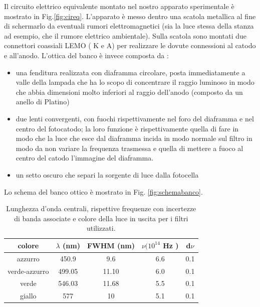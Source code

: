 \documentclass[10pt,a4paper]{article}
\begin{document}
Il circuito elettrico equivalente montato nel nostro apparato sperimentale è mostrato in Fig.\ref{fig:cireq}. L'apparato è messo dentro una scatola metallica al fine di schermarlo da eventuali rumori elettromagnetici (sia la luce stessa della stanza ad esempio, che il rumore elettrico ambientale). 
Sulla scatola sono montati due connettori coassiali LEMO ( K e A) per realizzare le dovute connessioni al catodo e all'anodo.
L'ottica del banco è invece composta da :

\begin{itemize}
\item una fenditura realizzata con diaframma circolare, posta immediatamente a valle della lampada che ha lo scopo di concentrare il raggio luminoso in modo che abbia dimensioni molto inferiori al raggio dell'anodo (composto da un anello di Platino)
\item due lenti convergenti, con fuochi rispettivamente nel foro del diaframma e nel centro del fotocatodo; la loro funzione è rispettivamente quella di fare in modo che la luce che esce dal diaframma incida in modo normale sul filtro in modo da non variare la frequenza trasmessa e quella di mettere a fuoco al centro del catodo l'immagine del diaframma.
\item un setto oscuro che separi la sorgente di luce dalla fotocella 
\end{itemize}

Lo schema del banco ottico è mostrato in Fig. \ref{fig:schemabanco}.

\begin{table}[h]
\caption{\small Lunghezza d'onda centrali, rispettive frequenze con incertezze di banda associate e colore della luce in uscita per i filtri utilizzati. }
\label{tab:filtri}
\begin{center}
\begin{tabular}{c|cccc}
\hline
colore & $\lambda$ (nm) & FWHM (nm) & $\nu (10^{14} $ Hz ) & d$\nu$   \\ 
\hline
azzurro & 450.9 & 9.6 & 6.6 & 0.1\\
verde-azzurro & 499.05 & 11.10 & 6.0 & 0.1\\
verde & 546.03  & 11.68 & 5.5 & 0.1\\
giallo & 577  &  10 & 5.1 & 0.1 \\
\hline
\end{tabular}
\end{center}
\end{table}
\end{document}
